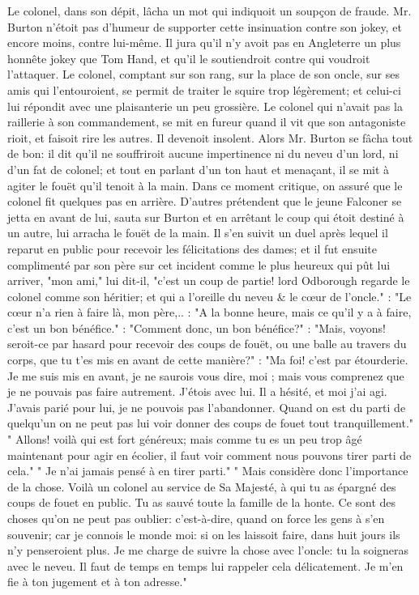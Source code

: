 Le colonel, dans son dépit, lâcha un mot qui indiquoit un soupçon de fraude. Mr. Burton n'étoit pas d'humeur de supporter cette insinuation contre son jokey, et encore moins, contre lui-même. Il jura qu'il n'y avoit pas en Angleterre un plus honnête jokey que Tom Hand, et qu'il le soutiendroit contre qui voudroit l'attaquer. Le colonel, comptant sur son rang, sur la place de son oncle, sur ses amis qui l'entouroient, se permit de traiter le squire trop légèrement; et celui-ci lui répondit avec une plaisanterie un peu grossière. Le colonel qui n'avait pas la raillerie à son commandement, se mit en fureur quand il vit que son antagoniste rioit, et faisoit rire les autres. Il devenoit insolent. Alors Mr. Burton se fâcha tout de bon: il dit qu'il ne souffriroit aucune impertinence ni du neveu d'un lord, ni d'un fat de colonel; et tout en parlant d'un ton haut et menaçant, il se mit à agiter le fouët qu'il tenoit à la main. Dans ce moment\setcounter{page}{523} critique, on assuré que le colonel fit quelques pas en arrière. D'autres prétendent que le jeune Falconer se jetta en avant de lui, sauta sur Burton et en arrêtant le coup qui étoit destiné à un autre, lui arracha le fouët de la main. Il s'en suivit un duel après lequel il reparut en public pour recevoir les félicitations des dames; et il fut ensuite complimenté par son père sur cet incident comme le plus heureux qui pût lui arriver, "mon ami," lui dit-il, "c'est un coup de partie! lord Odborough regarde le colonel comme son héritier; et qui a l'oreille du neveu & le cœur de l'oncle."
: "Le cœur n'a rien à faire là, mon père,..
: "A la bonne heure, mais ce qu'il y a à faire, c'est un bon bénéfice."
: "Comment donc, un bon bénéfice?"
: "Mais, voyons! seroit-ce par hasard pour recevoir des coups de fouët, ou une balle au travers du corps, que tu t'es mis en avant de cette manière?"
: "Ma foi! c'est par étourderie. Je me suis mis en avant, je ne saurois vous dire, moi ; mais vous comprenez que je ne pouvais pas faire autrement. J'étois avec lui. Il a hésité, et moi j'ai agi. J'avais parié pour lui, je ne pouvois pas l'abandonner. Quand on est du parti de quelqu'un on ne peut pas lui voir\setcounter{page}{524} donner des coups de fouet tout tranquillement."
" Allons! voilà qui est fort généreux; mais comme tu es un peu trop âgé maintenant pour agir en écolier, il faut voir comment nous pouvons tirer parti de cela."
" Je n'ai jamais pensé à en tirer parti."
" Mais considère donc l'importance de la chose. Voilà un colonel au service de Sa Majesté, à qui tu as épargné des coups de fouet en public. Tu as sauvé toute la famille de la honte. Ce sont des choses qu'on ne peut pas oublier: c'est-à-dire, quand on force les gens à s'en souvenir; car je connois le monde moi: si on les laissoit faire, dans huit jours ils n'y penseroient plus. Je me charge de suivre la chose avec l'oncle: tu la soigneras avec le neveu. Il faut de temps en temps lui rappeler cela délicatement. Je m'en fie à ton jugement et à ton adresse."
